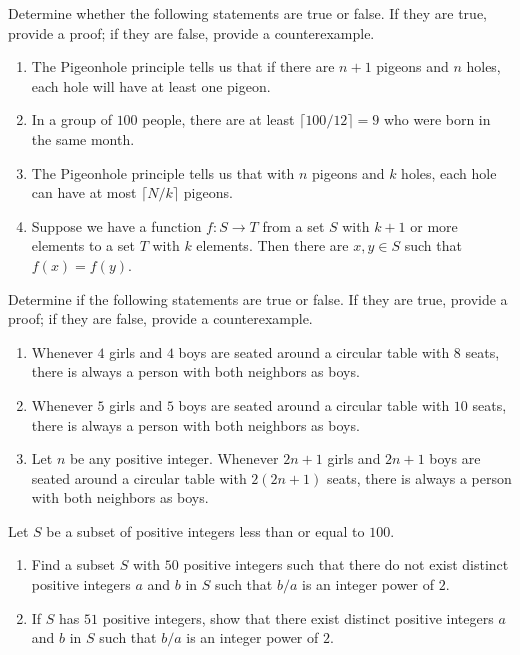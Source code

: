 \documentclass[../notes.tex]{subfiles}
\begin{document}
\begin{homework}
    Determine whether the following statements are true or false. If they are true, provide a proof; if they are false, provide a counterexample. 
    \begin{enumerate}[label=(\alph*)]
        \item The Pigeonhole principle tells us that if there are $n+1$ pigeons and $n$ holes, each hole will have at least one pigeon.
        \item In a group of $100$ people, there are at least $\lceil 100/12 \rceil = 9$ who were born in the same month.  
        \item The Pigeonhole principle tells us that with $n$ pigeons and $k$ holes, each hole can have at most $\lceil N/k \rceil$ pigeons.
        \item Suppose we have a function $f\colon S\to T$ from a set $S$ with $k+1$ or more elements to a set $T$ with $k$ elements. Then there are $x,y\in S$ such that $f(x)=f(y)$.
    \end{enumerate}
\end{homework}

\begin{homework}
    Determine if the following statements are true or false. If they are true, provide a proof; if they are false, provide a counterexample.
    \begin{enumerate}[label=(\alph*)]
        \item Whenever $4$ girls and $4$ boys are seated around a circular table with $8$ seats, there is always a person with both neighbors as boys.
        \item Whenever $5$ girls and $5$ boys are seated around a circular table with $10$ seats, there is always a person with both neighbors as boys.
        \item Let $n$ be any positive integer. Whenever $2n+1$ girls and $2n+1$ boys are seated around a circular table with $2(2n+1)$ seats, there is always a person with both neighbors as boys.
    \end{enumerate}
\end{homework}

\begin{homework}
    Let $S$ be a subset of positive integers less than or equal to $100$.
    \begin{enumerate}[label=(\alph*)]
        \item Find a subset $S$ with $50$ positive integers such that there do not exist distinct positive integers $a$ and $b$ in $S$ such that $b/a$ is an integer power of $2$.
        \item If $S$ has $51$ positive integers, show that there exist distinct positive integers $a$ and $b$ in $S$ such that $b/a$ is an integer power of $2$.
    \end{enumerate}
\end{homework}
\end{document}
